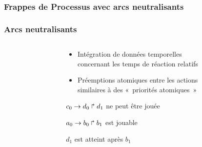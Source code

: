 
\begin{frame}[c]
  \frametitle{Frappes de Processus avec arcs neutralisants}


\end{frame}



\begin{frame}[c]
  \frametitle{Arcs neutralisants}

\begin{columns}
\begin{column}{.4\textwidth}


\end{column}
\begin{column}{.55\textwidth}
\begin{center}

\begin{itemize}
  \item Intégration de données temporelles\\
    concernant les temps de réaction relatifs
  \item Préemptions atomiques entre les actions\\
    similaires à des «~priorités atomiques~»
\end{itemize}

\vspace*{1cm}
$c_0\rightarrow d_0\Rsh d_1$ ne peut être jouée 

\bigskip
$a_0\rightarrow b_0\Rsh b_1$ est jouable

\bigskip
\f $d_1$ est  atteint après $b_1$

\end{center}
\end{column}
\end{columns}


\end{frame}

